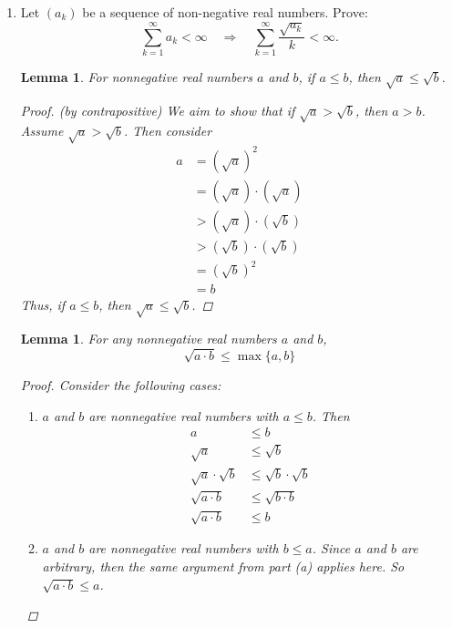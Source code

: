 \documentclass{amsart}
\newtheorem{lemma}[theorem]{Lemma}
\begin{document}
\begin{enumerate}[1.]
\newpage

\item  Let $(a_k)$ be a sequence of non-negative real numbers. Prove:   
\[ \sum_{k=1}^{\infty} a_k < \infty \quad \Rightarrow \quad \sum_{k=1}^{\infty} \frac{\sqrt{a_k}}{k} < \infty. \]
\begin{lemma}
    For nonnegative real numbers $a$ and $b$, if  $a \leq b$, then $\sqrt{a} \leq \sqrt{b}$.
    \begin{proof}
        (by contrapositive)
        We aim to show that if $\sqrt{a} > \sqrt{b}$, then $a > b$.
        Assume $\sqrt{a} > \sqrt{b}$. Then consider
        \begin{align*}
            a &= (\sqrt{a})^2 \\
            &= (\sqrt{a})\cdot (\sqrt{a}) \\
            &> (\sqrt{a})\cdot (\sqrt{b}) \\
            &> (\sqrt{b})\cdot (\sqrt{b}) \\
            &= (\sqrt{b})^2 \\
            &= b
        \end{align*}
        Thus, if $a \leq b$, then $\sqrt{a} \leq \sqrt{b}$.
    \end{proof}
\end{lemma}
\begin{lemma}
    For any nonnegative real numbers $a$ and $b$,
    \[
        \sqrt{a \cdot b} \leq \max\{a,b\}    
    \]
    \begin{proof}
        Consider the following cases:
        \begin{enumerate}
            \item $a$ and $b$ are nonnegative real numbers with $a \leq b$.
            Then 
            \begin{align*}
                a &\leq b \\
                \sqrt{a} &\leq \sqrt{b} \\
                \sqrt{a} \cdot \sqrt{b} &\leq \sqrt{b} \cdot \sqrt{b} \\
                \sqrt{a \cdot b} &\leq \sqrt{b \cdot b} \\
                \sqrt{a \cdot b} &\leq b
            \end{align*}
            \item $a$ and $b$ are nonnegative real numbers with $b \leq a$.
            Since $a$ and $b$ are arbitrary, then the same argument from part (a) applies here.
            So $\sqrt{a \cdot b} \leq a$. \\

\end{enumerate}
\end{proof}
\end{lemma}
\end{enumerate}
\end{document}
